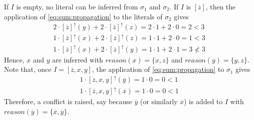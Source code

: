 \begin{example} \label{ex:sumpropagator}
    If $I$ is empty, no literal can be inferred from $\sigma_1$ and $\sigma_2$.
    If $I$ is $[\overline{z}]$, then the application of \eqref{eq:sum:propagation} to the literals of $\sigma_2$ gives
    \begin{align*}
        2 \cdot [\overline{z}]^\uparrow(y) + 2 \cdot [\overline{z}]^\uparrow(z) = 2 \cdot 1 + 2 \cdot 0 = 2 < 3\\
        1 \cdot [\overline{z}]^\uparrow(x) + 2 \cdot [\overline{z}]^\uparrow(z) = 1\cdot 1 + 2 \cdot 0 = 1 < 3\\
        1 \cdot [\overline{z}]^\uparrow(x) + 2 \cdot [\overline{z}]^\uparrow(y) = 1 \cdot 1 + 2 \cdot 1 = 3 \not< 3
    \end{align*}
    Hence, $x$ and $y$ are inferred with
    $\mathit{reason}(x) = \{x,z\}$ and
    $\mathit{reason}(y) = \{y,z\}$.
    Note that, once $I = [\overline{z},x,y]$, the application of \eqref{eq:sum:propagation} to $\sigma_1$ gives
    \begin{align*}
        1 \cdot [\overline{z},x,y]^\uparrow(\overline{y}) = 1 \cdot 0 = 0 < 1\\
        1 \cdot [\overline{z},x,y]^\uparrow(\overline{x}) = 1 \cdot 0 = 0 < 1
    \end{align*}
    Therefore, a conflict is raised, say because $\overline{y}$ (or similarly $\overline{x}$) 
    is added to $I$ with $\mathit{reason}(\overline{y}) = \{\overline{x}, \overline{y}\}$.
\end{example}
